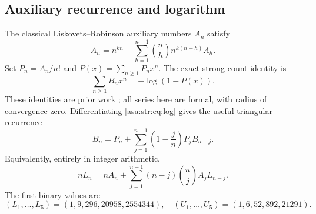 \documentclass[11pt,letterpaper]{article}
\theoremstyle{remark}\newtheorem{remark}[theorem]{Remark}
\numberwithin{equation}{section}
\begin{document}
\subsection{Auxiliary recurrence and logarithm}
The classical Liskovets--Robinson auxiliary numbers $A_n$ satisfy
\begin{equation}\label{asa:str:eq:aux}
 A_n=n^{kn}-\sum_{h=1}^{n-1}\binom nh n^{k(n-h)}A_h.
\end{equation}
Set $P_n=A_n/n!$ and $P(x)=\sum_{n\ge1}P_nx^n$. The exact strong-count identity is
\begin{equation}\label{asa:str:eq:log}
 \sum_{n\ge1}B_nx^n=-\log(1-P(x)).
\end{equation}
These identities are prior work \cite{L71,R85}; all series here are formal, with radius of convergence zero. Differentiating \eqref{asa:str:eq:log} gives the useful triangular recurrence
\begin{equation}\label{asa:str:eq:Brec}
 B_n=P_n+\sum_{j=1}^{n-1}\left(1-\frac jn\right)P_jB_{n-j}.
\end{equation}
Equivalently, entirely in integer arithmetic,
\begin{equation}\label{asa:str:eq:Lrec}
 nL_n=nA_n+\sum_{j=1}^{n-1}(n-j)\binom nj A_jL_{n-j}.
\end{equation}
The first binary values are
\[
 (L_1,\ldots,L_5)=(1,9,296,20958,2554344),\quad
 (U_1,\ldots,U_5)=(1,6,52,892,21291).
\]
\end{document}
